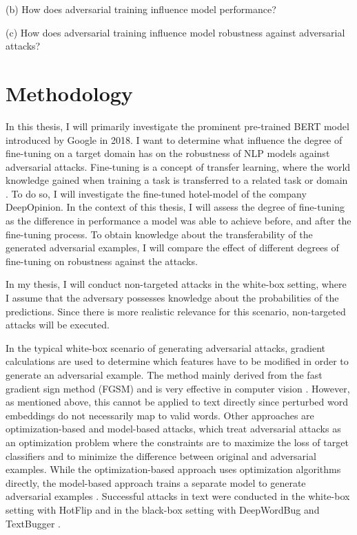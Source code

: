 (b) How does adversarial training influence model performance?

(c) How does adversarial training influence model robustness against adversarial attacks?

\section{Methodology}
In this thesis, I will primarily investigate the prominent pre-trained BERT model introduced by Google in 2018.
I want to determine what influence the degree of fine-tuning on a target domain has on the robustness of NLP models against adversarial attacks. Fine-tuning is a concept of transfer learning, where the world knowledge gained when training a task is transferred to a related task or domain \cite{pan2009survey}. To do so, I will investigate the fine-tuned hotel-model of the company DeepOpinion.
In the context of this thesis, I will assess the degree of fine-tuning as the difference in performance a model was able to achieve before, and after the fine-tuning process. 
To obtain knowledge about the transferability of the generated adversarial examples, I will compare the effect of different degrees of fine-tuning on robustness against the attacks. 



In my thesis, I will conduct non-targeted attacks in the white-box setting, where I assume that the adversary possesses knowledge about the probabilities of the predictions. Since there is more realistic relevance for this scenario, non-targeted attacks will be executed.

In the typical white-box scenario of generating adversarial attacks, gradient calculations are used to determine which features have to be modified in order to generate an adversarial example. The method mainly derived from the fast gradient sign method (FGSM) and is very effective in computer vision \cite{goodfellow2014explaining}. However, as mentioned above, this cannot be applied to text directly since perturbed word embeddings do not necessarily map to valid words. Other approaches are optimization-based and model-based attacks, which treat adversarial attacks as an optimization problem where the constraints are to maximize the loss of target classifiers and to minimize the difference between original and adversarial examples. While the optimization-based approach uses optimization algorithms directly, the model-based approach trains a separate model to generate adversarial examples \cite{xu2020elephant}. Successful attacks in text were conducted in the white-box setting with HotFlip \cite{ebrahimi2017hotflip} and in the black-box setting with DeepWordBug \cite{gao2018black} and TextBugger \cite{li2018textbugger}. 

